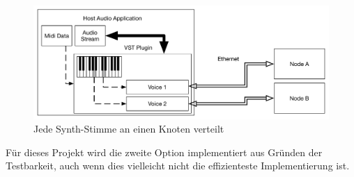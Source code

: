 \begin{figure}[H]
    \centering
    \includegraphics[width=\textwidth]{assets/distribute_byvoice.pdf}
    \caption{Jede Synth-Stimme an einen Knoten verteilt}
    \label{fig:pervoice}
\end{figure}

Für dieses Projekt wird die zweite Option implementiert aus  Gründen der Testbarkeit, auch wenn dies vielleicht nicht die effizienteste Implementierung ist.
